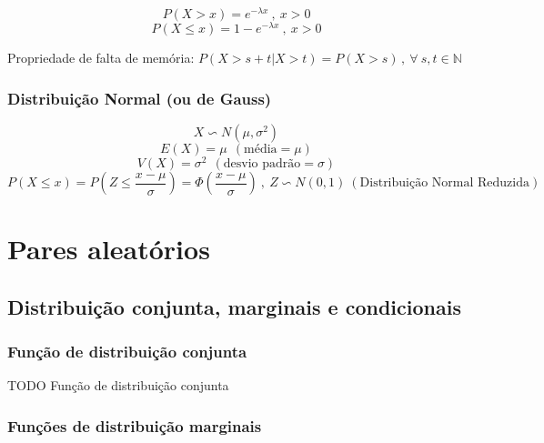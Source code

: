 \documentclass[11pt, a4paper]{article}
\begin{document}
\begin{equation*}
    P(X > x) = e^{-\lambda x}\ , \ x > 0
\end{equation*}
\begin{equation*}
    P(X \leq x) = 1 - e^{-\lambda x}\ , \ x > 0
\end{equation*}

Propriedade de falta de memória:
$P(X > s + t | X > t) = P(X > s) \, , \ \forall \  s, t \in \mathbb{N}$

\subsubsection*{Distribuição Normal (ou de Gauss)}

\begin{equation*}
    X \backsim N(\mu, \sigma^2)
\end{equation*}
\begin{equation*}
    E(X) = \mu \ \ (\text{média} = \mu)
\end{equation*}
\begin{equation*}
    V(X) = \sigma^2 \ \ (\text{desvio padrão} = \sigma)
\end{equation*}
\begin{equation*}
    P(X \leq x) = P\left(Z \leq \frac{x-\mu}{\sigma}\right) =
    \Phi\left(\frac{x-\mu}{\sigma}\right) \ , \
    Z \backsim N(0,1) \ (\text{Distribuição Normal Reduzida})
\end{equation*}

\newpage
\section{Pares aleatórios}

\subsection{Distribuição conjunta, marginais e condicionais}

\subsubsection*{Função de distribuição conjunta}

TODO Função de distribuição conjunta

\subsubsection*{Funções de distribuição marginais}
\end{document}
